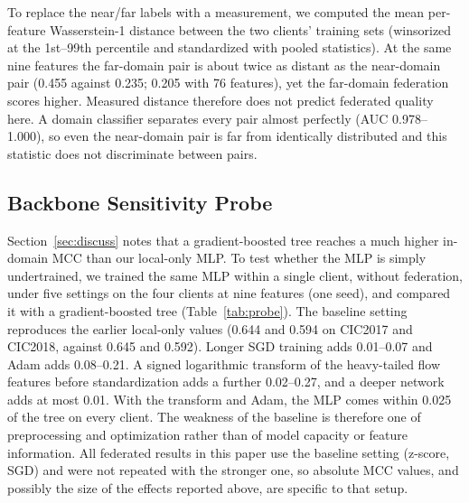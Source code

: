 \documentclass[conference,onecolumn]{IEEEtran}
\begin{document}
To replace the near/far labels with a measurement, we computed the mean per-feature Wasserstein-1
distance between the two clients' training sets (winsorized at the 1st--99th percentile and standardized
with pooled statistics). At the same nine features the far-domain pair is about twice as distant as the
near-domain pair (0.455 against 0.235; 0.205 with 76 features), yet the far-domain federation scores
higher. Measured distance therefore does not predict federated quality here. A domain classifier
separates every pair almost perfectly (AUC 0.978--1.000), so even the near-domain pair is far from
identically distributed and this statistic does not discriminate between pairs.

\subsection{Backbone Sensitivity Probe}
\label{sec:probe}
Section~\ref{sec:discuss} notes that a gradient-boosted tree reaches a much higher in-domain MCC than our
local-only MLP. To test whether the MLP is simply undertrained, we trained the same MLP within a single
client, without federation, under five settings on the four clients at nine features (one seed), and
compared it with a gradient-boosted tree (Table~\ref{tab:probe}). The baseline setting reproduces the
earlier local-only values (0.644 and 0.594 on CIC2017 and CIC2018, against 0.645 and 0.592). Longer SGD
training adds 0.01--0.07 and Adam adds 0.08--0.21. A signed logarithmic transform of the heavy-tailed
flow features before standardization adds a further 0.02--0.27, and a deeper network adds at most 0.01.
With the transform and Adam, the MLP comes within 0.025 of the tree on every client. The weakness of the
baseline is therefore one of preprocessing and optimization rather than of model capacity or feature
information. All federated results in this paper use the baseline setting (z-score, SGD) and were not
repeated with the stronger one, so absolute MCC values, and possibly the size of the effects reported
above, are specific to that setup.
\end{document}
